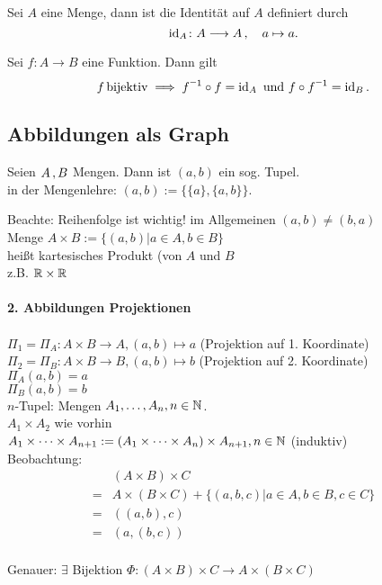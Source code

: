 \documentclass[../ana1.tex]{subfiles}
\begin{document}
\begin{defi*}[Identitätsabbildung]
	Sei \(A\) eine Menge, dann ist die Identität auf \(A\) definiert durch
	\[\operatorname{id}_{A} \colon A \longrightarrow A \operatorname{,} \quad a \mapsto a.\]
\end{defi*}


\begin{bem}
	Sei \(f \colon A \longrightarrow B\) eine Funktion. Dann gilt
	\[f \bijektiv \implies \inverse{f} \circ f = \id_{A} \text{ und } f \circ \inverse{f} = \id_{B}.\]
\end{bem}


\subsection{Abbildungen als Graph}

\begin{defi}
	Seien \(A \operatorname{,} B\) Mengen. Dann ist \((a,b)\) ein sog. Tupel.\\
	in der Mengenlehre: \((a,b) := \{ \{a\}, \{a,b\} \} \).
\end{defi}
Beachte: Reihenfolge ist wichtig! im Allgemeinen \( (a,b)\neq (b,a) \) \\
Menge \(A\times B := \{(a,b)|a\in A, b\in B\} \) \\
heißt kartesisches Produkt (von \(A\) und \(B\) \\
z.B. \( \mathbb{R}\times\mathbb{R} \) \\
\\
\textbf{2. Abbildungen Projektionen}\\
\\
\(\Pi_1 = \Pi_A : A\times B \rightarrow A, (a,b)\mapsto a\) (Projektion auf 1. Koordinate)\\
\(\Pi_2 = \Pi_B : A\times B \rightarrow B, (a,b) \mapsto b\) (Projektion auf 2. Koordinate)\\
\(\Pi_A(a,b) = a\) \\
\(\Pi_B(a,b) = b\) \\
\(n\)-Tupel: Mengen \(A_1,\dots ,A_n, n\in \mathbb{N} \).\\
\(A_1\times A_2\) wie vorhin\\
\(A_1\times\cdots\times A_{n+1} := (A_1\times\cdots\times A_n)\times A_{n+1}, n\in \mathbb{N} \) (induktiv)\\
Beobachtung:\\
\begin{align*}
	&(A\times B)\times C\\
	=& A\times (B\times C) + \{(a,b,c)|a\in A, b\in B, c\in C\} \\
	=& ((a,b),c)\\
	=& (a,(b,c))
\end{align*}
\[ \] \\
Genauer: \( \exists \) Bijektion \(\Phi : (A\times B) \times C \rightarrow A\times (B\times C)\)
\end{document}
